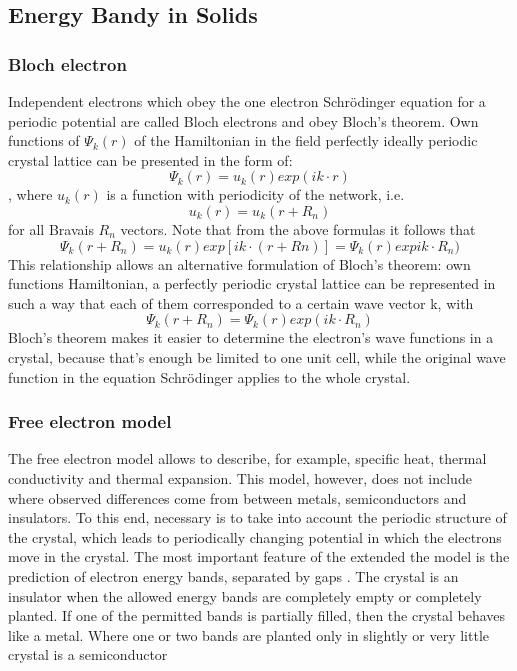 \subsection{Energy Bandy in Solids} \label{chap2}

\subsubsection*{Bloch electron}
Independent electrons which obey the one electron Schrödinger equation for a periodic potential are called Bloch
electrons and obey Bloch’s theorem. Own functions of $\Psi_k(r)$ of the Hamiltonian in the field perfectly ideally periodic crystal lattice can be presented in the form of:
\begin{equation}
\Psi_k(r) = u_k(r)exp(ik \cdot r)
\end{equation}
, where $u_k(r)$ is a function with periodicity of the network, i.e.
\begin{equation}
u_k(r) = u_k(r + R_n)
\end{equation}
for all Bravais $R_n$ vectors. Note that from the above formulas it follows that
$$
\Psi_k(r+R_n) =  u_k(r)exp[ik\cdot(r+Rn)]= \Psi_k(r)expik\cdot R_n)
$$
This relationship allows an alternative formulation of Bloch's theorem: own functions
Hamiltonian, a perfectly periodic crystal lattice can be represented in such a way that each
of them corresponded to a certain wave vector k, with
$$
\Psi_k(r+R_n) = \Psi_k(r)exp(ik \cdot R_n)
$$
Bloch's theorem makes it easier to determine the electron's wave functions in a crystal, because that's enough
be limited to one unit cell, while the original wave function in the equation
Schrödinger applies to the whole crystal.

\subsubsection*{Free electron model}

The free electron model allows to describe, for example,
specific heat, thermal conductivity and thermal expansion. This model, however, does not include where observed differences come from between metals, semiconductors and insulators. To this end, necessary
is to take into account the periodic structure of the crystal, which leads to periodically changing
potential in which the electrons move in the crystal. The most important feature of the extended
the model is the prediction of electron energy bands,
separated by gaps . The crystal is an insulator when the allowed energy bands are completely empty
or completely planted. If one of the permitted bands is partially filled, then
the crystal behaves like a metal. Where one or two bands are planted only in
slightly or very little crystal is a semiconductor


